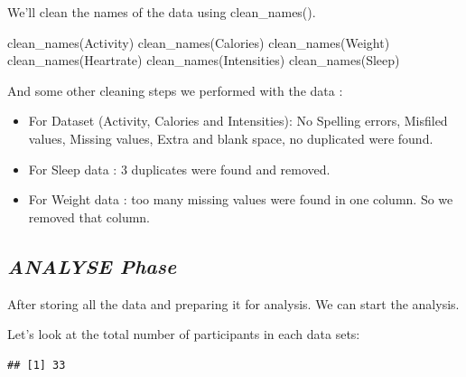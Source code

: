 \documentclass[
]{article}
\newenvironment{Shaded}{\begin{snugshade}}{\end{snugshade}}
\newcommand{\FunctionTok}[1]{\textcolor[rgb]{0.00,0.00,0.00}{#1}}
\newcommand{\NormalTok}[1]{#1}
\newcommand{\SpecialCharTok}[1]{\textcolor[rgb]{0.00,0.00,0.00}{#1}}
\begin{document}
We'll clean the names of the data using clean\_names().

\begin{Shaded}
\begin{Highlighting}[]
\FunctionTok{clean\_names}\NormalTok{(Activity)}
\FunctionTok{clean\_names}\NormalTok{(Calories)}
\FunctionTok{clean\_names}\NormalTok{(Weight)}
\FunctionTok{clean\_names}\NormalTok{(Heartrate)}
\FunctionTok{clean\_names}\NormalTok{(Intensities)}
\FunctionTok{clean\_names}\NormalTok{(Sleep)}
\end{Highlighting}
\end{Shaded}

And some other cleaning steps we performed with the data :

\begin{itemize}
\item
  For Dataset (Activity, Calories and Intensities): No Spelling errors,
  Misfiled values, Missing values, Extra and blank space, no duplicated
  were found.
\item
  For Sleep data : 3 duplicates were found and removed.
\item
  For Weight data : too many missing values were found in one column. So
  we removed that column.
\end{itemize}

\hypertarget{analyse-phase}{%
\subsection{\texorpdfstring{\textbf{\emph{ANALYSE
Phase}}}{ANALYSE Phase}}\label{analyse-phase}}

After storing all the data and preparing it for analysis. We can start
the analysis.

Let's look at the total number of participants in each data sets:

\begin{Shaded}
\end{Shaded}

\begin{verbatim}
## [1] 33
\end{verbatim}

\begin{Shaded}
\end{Shaded}
\end{document}
